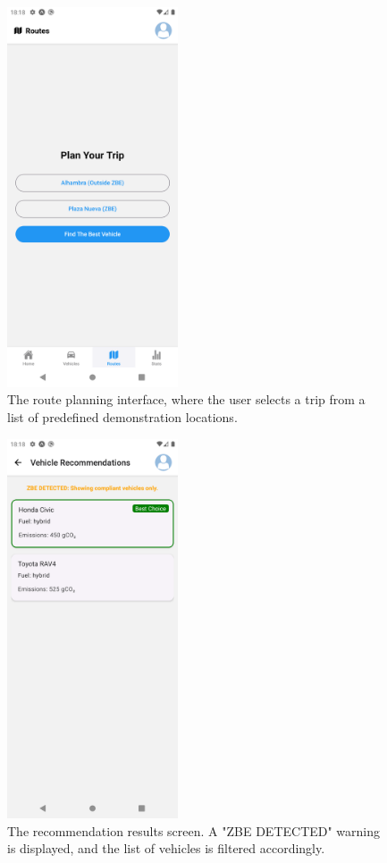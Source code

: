 \begin{figure}[H]
    \centering
    \includegraphics[width=0.45\textwidth]{images/results/route_planning_screen.png}
    \caption{The route planning interface, where the user selects a trip from a list of predefined demonstration locations.}
    \label{fig:route-planning-screen}
\end{figure}

\begin{figure}[H]
    \centering
    \includegraphics[width=0.45\textwidth]{images/results/recommendation_results_screen.png}
    \caption{The recommendation results screen. A "ZBE DETECTED" warning is displayed, and the list of vehicles is filtered accordingly.}
    \label{fig:recommendation-results-screen}
\end{figure}

